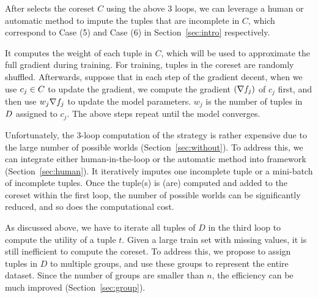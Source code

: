  After \ours selects the coreset $C$ using the above 3 loops, we can leverage a human or automatic method to impute the tuples that are incomplete in $C$, which correspond to Case (5) and Case (6) in Section~\ref{sec:intro} respectively. 




 It computes the weight of each tuple in $C$, which will be used to approximate the full gradient during training. For training, tuples in the coreset are randomly shuffled. Afterwards, suppose that in each step of the gradient decent, when we use $c_j \in C$ to update the gradient, we compute the gradient $(\nabla f_j)$ of $c_j$ first, and then use $w_j\nabla f_j$ to update the model parameters. $w_j$ is the number of tuples in $D$ assigned to $c_j$.  The above steps repeat until the model converges.


 Unfortunately, the 3-loop computation of the strategy is rather expensive due to the large number of possible worlds (Section~\ref{sec:without}).   To address this, we can   integrate either human-in-the-loop or the automatic method into \ours framework (Section~\ref{sec:human}).  It iteratively imputes one incomplete tuple or a mini-batch of incomplete tuples. Once the tuple(s) is (are) computed and added to the coreset within the first loop, the number of possible worlds can be significantly reduced, and so does the computational cost. %



 As discussed above, we have to iterate all tuples of $D$ in the third loop to compute the utility of a tuple $t$. Given a large train set with missing values, it is still inefficient to compute the coreset. To address this, we propose to assign tuples in $D$ to multiple groups, and use these groups to represent the entire dataset. Since the number of groups are smaller than $n$, the efficiency can be much improved (Section~\ref{sec:group}). 














